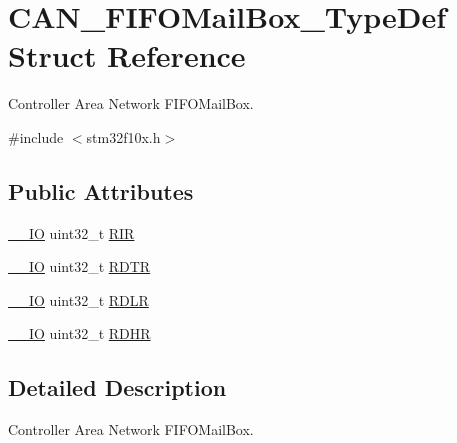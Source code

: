 \hypertarget{struct_c_a_n___f_i_f_o_mail_box___type_def}{\section{C\-A\-N\-\_\-\-F\-I\-F\-O\-Mail\-Box\-\_\-\-Type\-Def Struct Reference}
\label{struct_c_a_n___f_i_f_o_mail_box___type_def}
}


Controller Area Network F\-I\-F\-O\-Mail\-Box.  




{\ttfamily \#include $<$stm32f10x.\-h$>$}

\subsection*{Public Attributes}
\begin{DoxyCompactItemize}
\item 
\hyperlink{group___c_m_s_i_s__core__definitions_gaec43007d9998a0a0e01faede4133d6be}{\-\_\-\-\_\-\-I\-O} uint32\-\_\-t \hyperlink{struct_c_a_n___f_i_f_o_mail_box___type_def_a034504d43f7b16b320745a25b3a8f12d}{R\-I\-R}
\item 
\hyperlink{group___c_m_s_i_s__core__definitions_gaec43007d9998a0a0e01faede4133d6be}{\-\_\-\-\_\-\-I\-O} uint32\-\_\-t \hyperlink{struct_c_a_n___f_i_f_o_mail_box___type_def_a49d74ca8b402c2b9596bfcbe4cd051a9}{R\-D\-T\-R}
\item 
\hyperlink{group___c_m_s_i_s__core__definitions_gaec43007d9998a0a0e01faede4133d6be}{\-\_\-\-\_\-\-I\-O} uint32\-\_\-t \hyperlink{struct_c_a_n___f_i_f_o_mail_box___type_def_ac7d62861de29d0b4fcf11fabbdbd76e7}{R\-D\-L\-R}
\item 
\hyperlink{group___c_m_s_i_s__core__definitions_gaec43007d9998a0a0e01faede4133d6be}{\-\_\-\-\_\-\-I\-O} uint32\-\_\-t \hyperlink{struct_c_a_n___f_i_f_o_mail_box___type_def_a95890984bd67845015d40e82fb091c93}{R\-D\-H\-R}
\end{DoxyCompactItemize}


\subsection{Detailed Description}
Controller Area Network F\-I\-F\-O\-Mail\-Box. 


